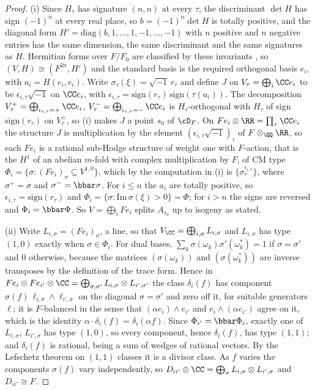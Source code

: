\begin{proof}
(i) Since $H_{\tau}$ has signature $(n,n)$ at every $\tau$, the discriminant
$\det H$ has sign $(-1)^{n}$ at every real place, so $b=(-1)^{n}\det H$ is
totally positive, and the diagonal form $H'=\mathrm{diag}(b,1,\dots,1,-1,\dots,-1)$
with $n$ positive and $n$ negative entries has the same dimension, the same
discriminant and the same signatures as $H$. Hermitian forms over $F/F_{0}$
are classified by these invariants \cite[Ch.~10, \S6]{Sch85}, so
$(V,H)\cong(F^{2n},H')$ and the standard basis is the required orthogonal
basis $e_{i}$, with $a_{i}=H(e_{i},e_{i})$. Write $\sigma_{\tau}(\xi)=\sqrt{-1}\,r_{\tau}$
and define $J$ on $V_{\tau}=\bigoplus_{i}\CC e_{i}$ to be
$\epsilon_{i,\tau}\sqrt{-1}$ on $\CC e_{i}$, with
$\epsilon_{i,\tau}=\mathrm{sign}(r_{\tau})\,\mathrm{sign}(\tau(a_{i}))$. The
decomposition $V_{\tau}^{+}=\bigoplus_{\epsilon_{i,\tau}=+}\CC e_{i}$,
$V_{\tau}^{-}=\bigoplus_{\epsilon_{i,\tau}=-}\CC e_{i}$ is $H_{\tau}$-orthogonal
with $H_{\tau}$ of sign $\mathrm{sign}(r_{\tau})$ on $V_{\tau}^{+}$, so
(i) makes $J$ a point $s_{0}$ of $\cD_{F}$. On
$Fe_{i}\otimes\RR=\prod_{\tau}\CC e_{i}$ the structure $J$ is multiplication by
the element $(\epsilon_{i,\tau}\sqrt{-1})_{\tau}$ of $F\otimes_{\QQ}\RR$, so
each $Fe_{i}$ is a rational sub-Hodge structure of weight one with
$F$-action, that is the $H^{1}$ of an abelian $m$-fold with complex
multiplication by $F$, of CM type
$\Phi_{i}=\{\sigma:(Fe_{i})_{\sigma}\subseteq V^{1,0}\}$, which by the
computation in (i) is
$\{\sigma_{\tau}^{\epsilon_{i,\tau}}\}$, where $\sigma^{+}=\sigma$ and
$\sigma^{-}=\bbar\sigma$. For $i\le n$ the $a_{i}$ are totally positive, so
$\epsilon_{i,\tau}=\mathrm{sign}(r_{\tau})$ and
$\Phi_{i}=\{\sigma:\mathrm{Im}\,\sigma(\xi)>0\}=\Phi$; for $i>n$ the signs are
reversed and $\Phi_{i}=\bbar\Phi$. So $V=\bigoplus_{i}Fe_{i}$ splits
$A_{s_{0}}$ up to isogeny as stated.

(ii) Write $L_{i,\sigma}=(Fe_{i})_{\sigma}$, a line, so that
$V_{\CC}=\bigoplus_{i,\sigma}L_{i,\sigma}$ and $L_{i,\sigma}$ has type $(1,0)$
exactly when $\sigma\in\Phi_{i}$. For dual bases,
$\sum_{k}\sigma(\omega_{k})\sigma'(\omega_{k}^{*})=1$ if $\sigma=\sigma'$ and
$0$ otherwise, because the matrices $(\sigma(\omega_{k}))$ and
$(\sigma(\omega_{k}^{*}))$ are inverse transposes by the definition of the
trace form. Hence in $Fe_{i}\otimes Fe_{i'}\otimes\CC
=\bigoplus_{\sigma,\sigma'}L_{i,\sigma}\otimes L_{i',\sigma'}$ the class
$\delta_{i}(f)$ has component $\sigma(f)\,\ell_{i,\sigma}\wedge\ell_{i',\sigma}$
on the diagonal $\sigma=\sigma'$ and zero off it, for suitable generators
$\ell$; it is $F$-balanced in the sense that $(\alpha e_{i})\wedge e_{i'}$ and
$e_{i}\wedge(\alpha e_{i'})$ agree on it, which is the identity
$\alpha\cdot\delta_{i}(f)=\delta_{i}(\alpha f)$. Since $\Phi_{i'}=\bbar\Phi_{i}$,
exactly one of $L_{i,\sigma}$, $L_{i',\sigma}$ has type $(1,0)$, so every
component, hence $\delta_{i}(f)$, has type $(1,1)$; and $\delta_{i}(f)$ is
rational, being a sum of wedges of rational vectors. By the Lefschetz theorem
on $(1,1)$ classes it is a divisor class. As $f$ varies the components
$\sigma(f)$ vary independently, so $D_{ii'}\otimes\CC=\bigoplus_{\sigma}
L_{i,\sigma}\otimes L_{i',\sigma}$ and $D_{ii'}\cong F$.


\end{proof}
